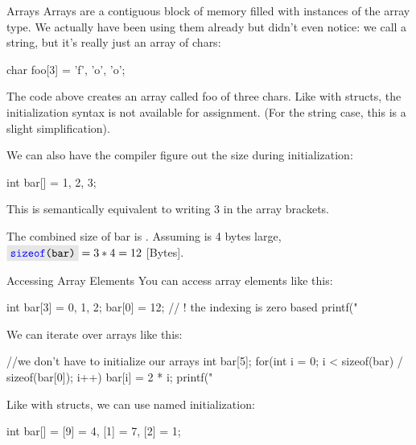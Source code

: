 \documentclass[10pt,graphics,aspectratio=169,table]{beamer}
\begin{document}
\begin{frame}[fragile]{Arrays}
    Arrays are a contiguous block of memory 
    filled with instances of the array type.
    We actually have been using them already but didn't even notice:
    we call  a string, but it's really just an array of chars:
    \begin{codeblock}
char foo[3] = {'f', 'o', 'o'}; 
    \end{codeblock} 

    The code above creates an array called foo of three chars.
    Like with structs, the initialization syntax is not available for
    assignment. (For the string case, this is a slight simplification).
    
    We can also have the compiler figure out the size during initialization:
    \begin{codeblock}
int bar[] = {1, 2, 3};
    \end{codeblock} 

    This is semantically equivalent to writing 3 in the array brackets.

    The combined size of bar is .
    Assuming  is 4 bytes large, $\code{sizeof(bar)} = 3 * 4 = 12$ [Bytes].
   
\end{frame}

\begin{frame}[fragile]{Accessing Array Elements}
    You can access array elements like this: 
    \begin{codeblock}
int bar[3] = {0, 1, 2};
bar[0] = 12; // ! the indexing is zero based
printf("%
    \end{codeblock}

    We can iterate over arrays like this: 
    \begin{codeblock}
//we don't have to initialize our arrays
int bar[5];
for(int i = 0; i < sizeof(bar) / sizeof(bar[0]); i++){
    bar[i] = 2 * i;
    printf("%
}    
    \end{codeblock}
  

    Like with structs, we can use named initialization: 
    \begin{codeblock}
int bar[] = {[9] = 4, [1] = 7, [2] = 1};
    \end{codeblock}
\end{frame}
\end{document}
